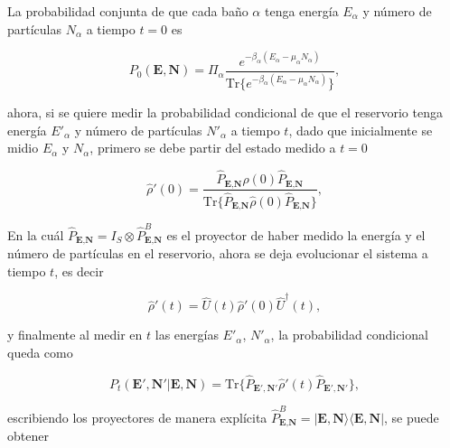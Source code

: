 La probabilidad conjunta de que cada baño $\alpha$ tenga energía $E_{\alpha}$ y número de partículas $N_{\alpha}$ a tiempo $t=0$ es

\begin{equation*}
    P_{0}(\textbf{E},\textbf{N}) = \Pi_{\alpha}  \frac{e^{-\beta_{\alpha}(E_{\alpha} - \mu_{\alpha}N_{\alpha} )  }}{ \text{Tr}\{e^{-\beta_{\alpha}(E_{\alpha} - \mu_{\alpha}N_{\alpha} )  }\} },
\end{equation*}

ahora, si se quiere medir la probabilidad condicional de que el reservorio tenga energía $E'_{\alpha}$ y número de partículas $N'_{\alpha}$ a tiempo $t$, dado que inicialmente se midio $E_{\alpha}$ y $N_{\alpha}$, primero se debe partir del estado medido a $t=0$

\begin{equation*}
    \hat{\rho}'(0) = \frac{\hat{P}_{\textbf{E}, \textbf{N} }\hat{\rho}(0) \hat{P}_{\textbf{E}, \textbf{N} } }{\text{Tr}\{\hat{P}_{\textbf{E}, \textbf{N} }\hat{\rho}(0) \hat{P}_{\textbf{E}, \textbf{N} } \} },
\end{equation*}

En la cuál $\hat{P}_{\textbf{E}, \textbf{N} } = I_{S} \otimes \hat{P}^{B}_{\textbf{E}, \textbf{N} }$ es el proyector de haber medido la energía y el número de partículas en el reservorio, ahora se deja evolucionar el sistema a tiempo $t$, es decir

\begin{equation*}
    \hat{\rho}'(t) = \hat{U}(t)\hat{\rho}'(0)\hat{U}^{\dagger}(t),
\end{equation*}

y finalmente al medir en $t$ las energías $E'_{\alpha}$, $N'_{\alpha}$, la probabilidad condicional queda como

\begin{equation*}
    P_{t}(\textbf{E}',\textbf{N}'|\textbf{E},\textbf{N}) = \text{Tr}\{\hat{P}_{\textbf{E}', \textbf{N}' }\hat{\rho}'(t) \hat{P}_{\textbf{E}', \textbf{N}' } \},
\end{equation*}

escribiendo los proyectores de manera explícita $\hat{P}^{B}_{\textbf{E}, \textbf{N} } = |\textbf{E}, \textbf{N} \rangle\langle \textbf{E}, \textbf{N}|$, se puede obtener 

